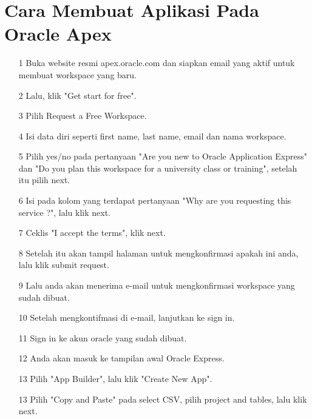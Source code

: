 \section{Cara Membuat Aplikasi Pada Oracle Apex}

\begin{enumerate}

\item[1] Buka website resmi apex.oracle.com dan siapkan email yang aktif untuk membuat workspace yang baru.
    
\item[2] Lalu, klik "Get start for free".

\item[3] Pilih Request a Free Workspace.

\item[4] Isi data diri seperti first name, last name, email dan nama workspace.

\item[5] Pilih yes/no pada pertanyaan "Are you new to Oracle Application Express" dan "Do you plan this workspace for a university class or training", setelah itu pilih next.

\item[6] Isi pada kolom yang terdapat pertanyaan "Why are you requesting this service ?", lalu klik next.

\item[7] Ceklis "I accept the terms", klik next.

\item[8] Setelah itu akan tampil halaman untuk mengkonfirmasi apakah ini anda, lalu klik submit request.

\item[9] Lalu anda akan menerima e-mail untuk mengkonfirmasi workspace yang sudah dibuat.

\item[10] Setelah mengkontifmasi di e-mail, lanjutkan ke sign in.

\item[11] Sign in ke akun oracle yang sudah dibuat.

\item[12] Anda akan masuk ke tampilan awal Oracle Express.

\item[13] Pilih "App Builder", lalu klik "Create New App".

\item[13] Pilih "Copy and Paste" pada select CSV, pilih project and tables, lalu klik next.


\end{enumerate}
